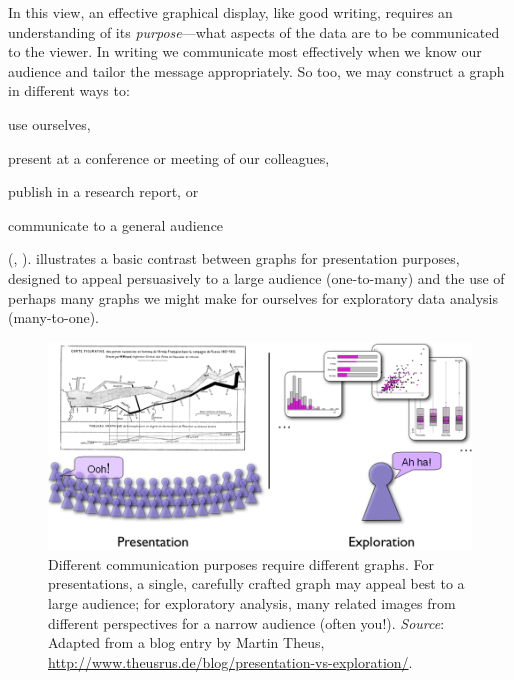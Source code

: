 \documentclass[11pt]{book}
\begin{document}
In this view,
an effective graphical display, like good writing, requires an
understanding of its \emph{purpose}---what aspects of the data are to be
communicated to the viewer.  In writing we communicate most
effectively when we know our audience and tailor the message
appropriately. So too, we may construct a graph in different ways to:
\begin{seriate}
  \item use ourselves, 
  \item present at a conference or meeting of our colleagues, 
  \item publish in a research report, or
  \item communicate to a general audience
\end{seriate}
(\citet[Ch. 1]{Friendly:91}, \citet{FriendlyKwan:2011}).
 illustrates a basic contrast between graphs
for presentation purposes, designed to appeal persuasively to a large audience
(one-to-many)
and the use of perhaps many graphs we might make for ourselves for 
exploratory data analysis (many-to-one).

\begin{figure}[htb]
\centering
\includegraphics[width=.8\textwidth]{ch01/fig/presentation-exploration2}
\caption[Different communication purposes require different graphs]{Different communication purposes require different graphs. For presentations, a single, carefully crafted graph may appeal best to a large audience; for exploratory analysis, many related images from different perspectives for a narrow audience (often you!). \emph{Source}: Adapted from a blog entry by Martin Theus, \url{http://www.theusrus.de/blog/presentation-vs-exploration/}.}\label{fig:presentation-exploration}
\end{figure}
\end{document}
